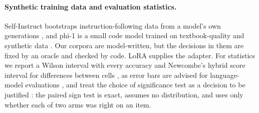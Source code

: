 \paragraph{Synthetic training data and evaluation statistics.}
Self-Instruct bootstraps instruction-following data from a model's own generations
\citep{wang2023selfinstruct}, and phi-1 is a small code model trained on textbook-quality and
synthetic data \citep{gunasekar2023textbooks}. Our corpora are model-written, but the
decisions in them are fixed by an oracle and checked by code. LoRA \citep{hu2022lora}
supplies the adapter. For statistics we report a Wilson interval \citep{wilson1927probable}
with every accuracy and Newcombe's hybrid score interval for differences between cells
\citep{newcombe1998interval}, as error bars are advised for language-model evaluations
\citep{miller2024errorbars}, and treat the choice of significance test as a decision to be
justified \citep{dror2018hitchhiker}: the paired sign test is exact, assumes no distribution,
and uses only whether each of two arms was right on an item.
